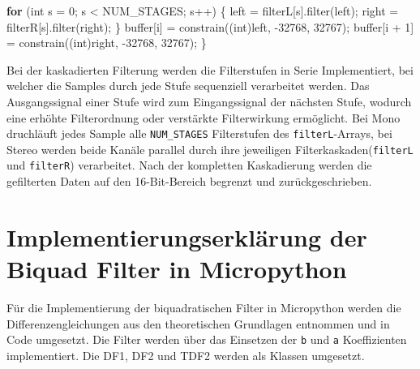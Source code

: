 \documentclass[
  ngerman,
  letterpaper,
  DIV=11]{scrreprt}
\newenvironment{Shaded}{\begin{snugshade}}{\end{snugshade}}
\newcommand{\ControlFlowTok}[1]{\textcolor[rgb]{0.00,0.23,0.31}{\textbf{#1}}}
\newcommand{\DataTypeTok}[1]{\textcolor[rgb]{0.68,0.00,0.00}{#1}}
\newcommand{\DecValTok}[1]{\textcolor[rgb]{0.68,0.00,0.00}{#1}}
\newcommand{\NormalTok}[1]{\textcolor[rgb]{0.00,0.23,0.31}{#1}}
\newcommand{\OperatorTok}[1]{\textcolor[rgb]{0.37,0.37,0.37}{#1}}
\begin{document}
\begin{Shaded}
\begin{Highlighting}[]
    \ControlFlowTok{for} \OperatorTok{(}\DataTypeTok{int}\NormalTok{ s }\OperatorTok{=} \DecValTok{0}\OperatorTok{;}\NormalTok{ s }\OperatorTok{\textless{}}\NormalTok{ NUM\_STAGES}\OperatorTok{;}\NormalTok{ s}\OperatorTok{++)} \OperatorTok{\{}
\NormalTok{      left }\OperatorTok{=}\NormalTok{ filterL}\OperatorTok{[}\NormalTok{s}\OperatorTok{].}\NormalTok{filter}\OperatorTok{(}\NormalTok{left}\OperatorTok{);}
\NormalTok{      right }\OperatorTok{=}\NormalTok{ filterR}\OperatorTok{[}\NormalTok{s}\OperatorTok{].}\NormalTok{filter}\OperatorTok{(}\NormalTok{right}\OperatorTok{);}
    \OperatorTok{\}}
\NormalTok{  buffer}\OperatorTok{[}\NormalTok{i}\OperatorTok{]} \OperatorTok{=}\NormalTok{ constrain}\OperatorTok{((}\DataTypeTok{int}\OperatorTok{)}\NormalTok{left}\OperatorTok{,} \OperatorTok{{-}}\DecValTok{32768}\OperatorTok{,} \DecValTok{32767}\OperatorTok{);}
\NormalTok{  buffer}\OperatorTok{[}\NormalTok{i }\OperatorTok{+} \DecValTok{1}\OperatorTok{]} \OperatorTok{=}\NormalTok{ constrain}\OperatorTok{((}\DataTypeTok{int}\OperatorTok{)}\NormalTok{right}\OperatorTok{,} \OperatorTok{{-}}\DecValTok{32768}\OperatorTok{,} \DecValTok{32767}\OperatorTok{);}
\OperatorTok{\}}
\end{Highlighting}
\end{Shaded}

Bei der kaskadierten Filterung werden die Filterstufen in Serie
Implementiert, bei welcher die Samples durch jede Stufe sequenziell
verarbeitet werden. Das Ausgangssignal einer Stufe wird zum
Eingangssignal der nächsten Stufe, wodurch eine erhöhte Filterordnung
oder verstärkte Filterwirkung ermöglicht. Bei Mono druchläuft jedes
Sample alle \texttt{NUM\_STAGES} Filterstufen des
\texttt{filterL}-Arrays, bei Stereo werden beide Kanäle parallel durch
ihre jeweiligen Filterkaskaden(\texttt{filterL} und \texttt{filterR})
verarbeitet. Nach der kompletten Kaskadierung werden die gefilterten
Daten auf den 16-Bit-Bereich begrenzt und zurückgeschrieben.

\chapter{Implementierungserklärung der Biquad Filter in
Micropython}\label{implementierungserkluxe4rung-der-biquad-filter-in-micropython}

Für die Implementierung der biquadratischen Filter in Micropython werden
die Differenzengleichungen aus den theoretischen Grundlagen entnommen
und in Code umgesetzt. Die Filter werden über das Einsetzen der
\texttt{b} und \texttt{a} Koeffizienten implementiert. Die DF1, DF2 und
TDF2 werden als Klassen umgesetzt.
\end{document}
